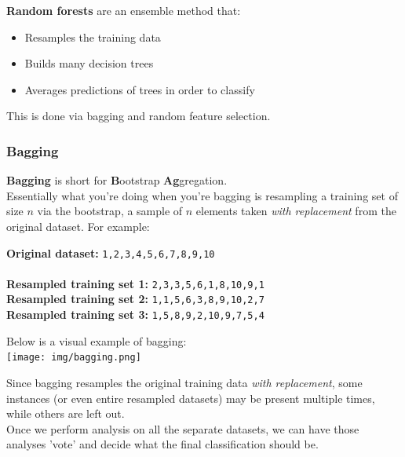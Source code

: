\documentclass[english, 10pt]{article}
\begin{document}
\textbf{Random forests} are an ensemble method that:

\begin{itemize}
	\item Resamples the training data
	\item Builds many decision trees
	\item Averages predictions of trees in order to classify
\end{itemize}

This is done via bagging and random feature selection.

\subsubsection{Bagging}

\textbf{Bagging} is short for \textbf{B}ootstrap \textbf{Ag}gregation.\\

Essentially what you're doing when you're bagging is resampling a training set of size $n$ via the bootstrap, a sample of $n$ elements taken \textit{with replacement} from the original dataset. For example:\\

\begin{myproof}
\textbf{Original dataset:} \texttt{1,2,3,4,5,6,7,8,9,10}\\\\

\textbf{Resampled training set 1:} \texttt{2,3,3,5,6,1,8,10,9,1}\\
\textbf{Resampled training set 2:} \texttt{1,1,5,6,3,8,9,10,2,7}\\
\textbf{Resampled training set 3:} \texttt{1,5,8,9,2,10,9,7,5,4}
\end{myproof}

\hfill \break Below is a visual example of bagging:\\

{
\centering
\texttt{[image: img/bagging.png]} 
}

\hfill \break Since bagging resamples the original training data \textit{with replacement}, some instances (or even entire resampled datasets) may be present multiple times, while others are left out.\\

Once we perform analysis on all the separate datasets, we can have those analyses 'vote' and decide what the final classification should be.\\
\end{document}
